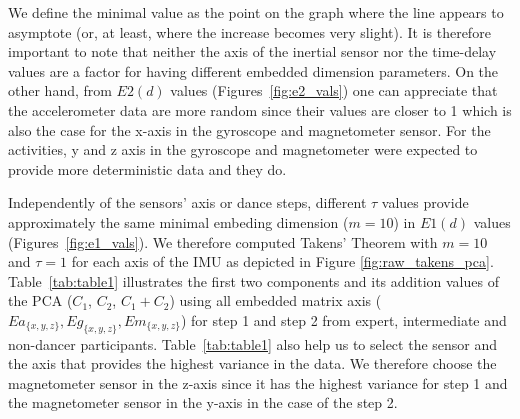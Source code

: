\documentclass{sigchi}
\begin{document}
  
We define the minimal value as the point on the graph where the 
line appears to asymptote (or, at least, where the increase becomes very slight). 
It is therefore important to note that neither the axis of the inertial sensor nor the time-delay values 
are a factor for having different embedded dimension parameters.
On the other hand, from $E2(d)$ values (Figures~\ref{fig:e2_vals})
one can appreciate that the accelerometer data are more random since their values are closer to 1
which is also the case for the x-axis in the gyroscope and magnetometer sensor. 
For the activities, y and z axis in the gyroscope and magnetometer were expected to provide more deterministic data and they do.


Independently of the sensors' axis or dance steps, different $\tau$ values provide approximately the 
same minimal embeding dimension ($m=10$) in $E1(d)$ values (Figures~\ref{fig:e1_vals}).
We therefore computed Takens' Theorem 
with $m=10$ and $\tau = 1$ for each axis of the IMU as depicted in Figure \ref{fig:raw_takens_pca}.
Table~\ref{tab:table1} illustrates the first two components and its addition values of the PCA ($C_1$, $C_2$, $C_1+ C_2$)
using all embedded matrix axis ($Ea_{ \{ x,y,z \} },Eg_{\{ x,y,z \}},Em_{\{ x,y,z \}}$) for step 1 and step 2 from expert, 
intermediate and non-dancer participants.
Table~\ref{tab:table1} also help us to select the sensor and the axis that 
provides the highest variance in the data.
We therefore choose the magnetometer sensor in the z-axis since it has the highest variance for step 1
and the magnetometer sensor in the y-axis in the case of the step 2.
\end{document}
